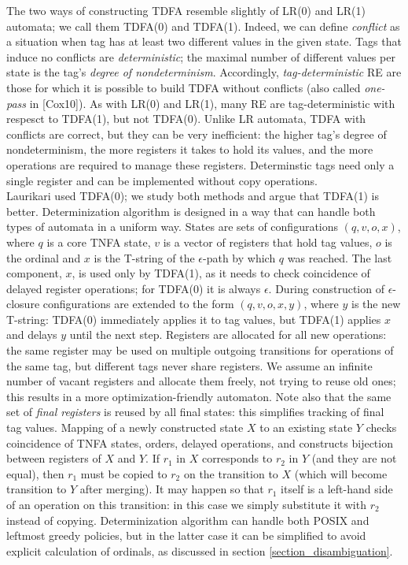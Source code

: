 \documentclass{article}
\theoremstyle{definition}
\begin{document}
\begin{multicols}{2}
The two ways of constructing TDFA resemble slightly of LR(0) and LR(1) automata; we call them TDFA(0) and TDFA(1).
Indeed, we can define \emph{conflict} as a situation when tag has at least two different values in the given state.
Tags that induce no conflicts are \emph{deterministic};
the maximal number of different values per state is the tag's \emph{degree of nondeterminism}.
Accordingly, \emph{tag-deterministic} RE are those for which it is possible to build TDFA without conflicts
(also called \emph{one-pass} in [Cox10]).
As with LR(0) and LR(1), many RE are tag-deterministic with respesct to TDFA(1), but not TDFA(0).
Unlike LR automata, TDFA with conflicts are correct, but they can be very inefficient:
the higher tag's degree of nondeterminism, the more registers it takes to hold its values,
and the more operations are required to manage these registers.
Determinstic tags need only a single register and can be implemented without copy operations.
\\

Laurikari used TDFA(0); we study both methods and argue that TDFA(1) is better.
Determinization algorithm is designed in a way that can handle both types of automata in a uniform way.
States are sets of configurations $(q, v, o, x)$,
where $q$ is a core TNFA state, $v$ is a vector of registers that hold tag values, $o$ is the ordinal
and $x$ is the T-string of the $\epsilon$-path by which $q$ was reached.
The last component, $x$, is used only by TDFA(1), as it needs to check coincidence of delayed register operations;
for TDFA(0) it is always $\epsilon$.
During construction of $\epsilon$-closure configurations are extended to the form $(q, v, o, x, y)$,
where $y$ is the new T-string: TDFA(0) immediately applies it to tag values,
but TDFA(1) applies $x$ and delays $y$ until the next step.
Registers are allocated for all new operations:
the same register may be used on multiple outgoing transitions for operations of the same tag,
but different tags never share registers.
We assume an infinite number of vacant registers and allocate them freely, not trying to reuse old ones;
this results in a more optimization-friendly automaton.
Note also that the same set of \emph{final registers} is reused by all final states:
this simplifies tracking of final tag values.
Mapping of a newly constructed state $X$ to an existing state $Y$ checks coincidence of TNFA states, orders, delayed operations,
and constructs bijection between registers of $X$ and $Y$.
If $r_1$ in $X$ corresponds to $r_2$ in $Y$ (and they are not equal), then $r_1$ must be copied to $r_2$ on the transition to $X$
(which will become transition to $Y$ after merging).
It may happen so that $r_1$ itself is a left-hand side of an operation on this transition:
in this case we simply substitute it with $r_2$ instead of copying.
Determinization algorithm can handle both POSIX and leftmost greedy policies,
but in the latter case it can be simplified to avoid explicit calculation of ordinals, as discussed in section \ref{section_disambiguation}.
\\


\end{multicols}
\end{document}
